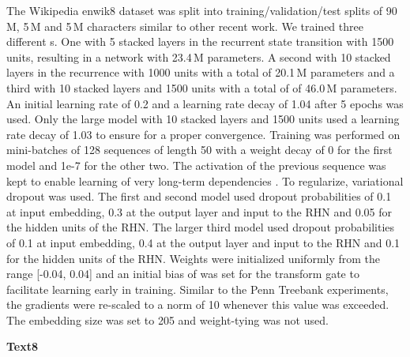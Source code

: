 \documentclass[letterpaper]{article}
\begin{document}
The Wikipedia enwik8 dataset \citep{hutter_prize} was split into training/validation/test splits of 90\,M, 5\,M and 5\,M characters similar to other recent work.
We trained three different \arch{}s. One with 5 stacked layers in the recurrent state transition with 1500 units, resulting in a network with 23.4\,M parameters. A second with 10 stacked layers in the recurrence with 1000 units with a total of 20.1\,M parameters and a third with 10 stacked layers and 1500 units with a total of of 46.0\,M parameters.
An initial learning rate of 0.2 and a learning rate decay of 1.04 after 5 epochs was used. Only the large model with 10 stacked layers and 1500 units used a learning rate decay of 1.03 to ensure for a proper convergence.
Training was performed on mini-batches of 128 sequences of length 50 with a weight decay of 0 for the first model and 1e-7 for the other two.
The activation of the previous sequence was kept to enable learning of very long-term dependencies \citep{graves_generating_sequences}. 
To regularize, variational dropout \citep{gal2015} was used. The first and second model used dropout probabilities of 0.1 at input embedding, 0.3 at the output layer and input to the RHN and 0.05 for the hidden units of the RHN. The larger third model used dropout probabilities of 0.1 at input embedding, 0.4 at the output layer and input to the RHN and 0.1 for the hidden units of the RHN.
Weights were initialized uniformly from the range [-0.04, 0.04] and an initial bias of  was set for the transform gate to facilitate learning early in training. 
Similar to the Penn Treebank experiments, the gradients were re-scaled to a norm of 10 whenever this value was exceeded. The embedding size was set to 205 and weight-tying \citep{weight_tying} was not used. 

\textbf{Text8}
\end{document}
